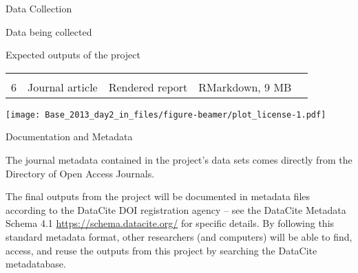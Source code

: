 \documentclass[ignorenonframetext,]{beamer}
\begin{document}
\begin{frame}[fragile]{Data Collection}
\begin{block}{Data being collected}
\begin{block}{Expected outputs of the project}
\begin{longtable}[]{@{}cllll@{}}
\begin{minipage}[t]{0.18\columnwidth}
\strut
\end{minipage}\tabularnewline
\begin{minipage}[t]{0.11\columnwidth}\centering\strut
6\strut
\end{minipage} & \begin{minipage}[t]{0.11\columnwidth}\raggedright\strut
Journal article\strut
\end{minipage} & \begin{minipage}[t]{0.16\columnwidth}\raggedright\strut
Rendered report\strut
\end{minipage} & \begin{minipage}[t]{0.14\columnwidth}\raggedright\strut
RMarkdown, 9 MB\strut
\end{minipage} & \begin{minipage}[t]{0.18\columnwidth}\raggedright\strut
\strut
\end{minipage}\tabularnewline
\bottomrule
\end{longtable}

\texttt{[image: Base\_2013\_day2\_in\_files/figure-beamer/plot\_license-1.pdf]}

\end{block}

\end{block}

\end{frame}

\begin{frame}{Documentation and Metadata}

The journal metadata contained in the project's data sets comes directly
from the Directory of Open Access Journals.

The final outputs from the project will be documented in metadata files
according to the DataCite DOI registration agency -- see the DataCite
Metadata Schema 4.1 \url{https://schema.datacite.org/} for specific
details. By following this standard metadata format, other researchers
(and computers) will be able to find, access, and reuse the outputs from
this project by searching the DataCite metadatabase.

\end{frame}
\end{document}
